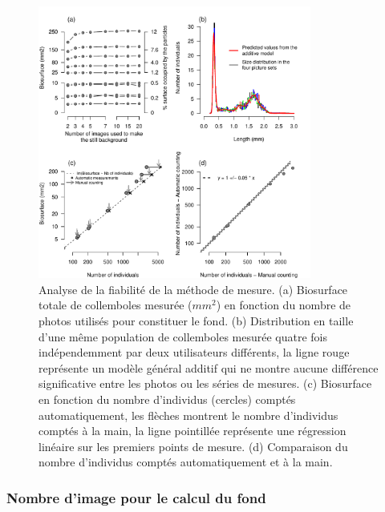 \begin{figure}[!ht]
\begin{center}
\includegraphics[width=0.80\textwidth]{1_CorpsDeThese/Methodo/6_Plugin_multiP}
\caption[ Analyse de la
fiabilité]{Analyse de la fiabilité de la méthode de mesure. (a) Biosurface
totale de collemboles mesurée ($mm^2$) en fonction du nombre de photos utilisés
pour constituer le fond. (b) Distribution en taille d'une même population de
collemboles mesurée quatre fois indépendemment par deux utilisateurs
différents, la ligne rouge représente un modèle général additif qui ne montre
aucune différence significative entre les photos ou les séries de mesures. (c)
Biosurface en fonction du nombre d'individus (cercles) comptés automatiquement,
les flèches montrent le nombre d'individus comptés à la main, la ligne
pointillée représente une régression linéaire sur les premiers points de mesure.
(d) Comparaison du nombre d'individus comptés automatiquement et à la main. }
\label{fig:photofiabi}
\end{center}
\end{figure}

\subsubsection{Nombre d'image pour le calcul du fond}

